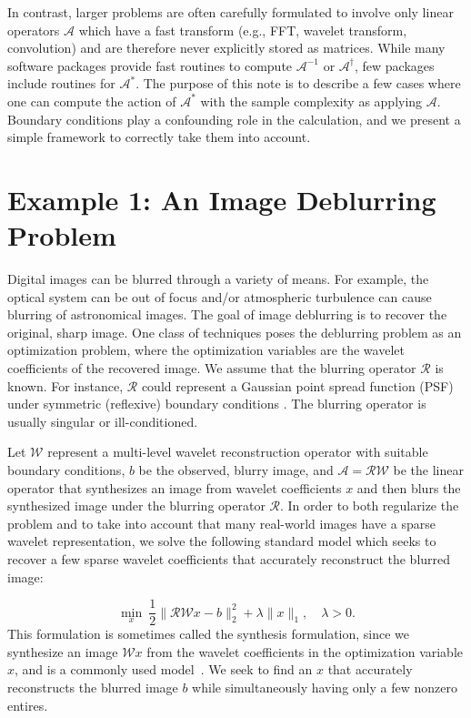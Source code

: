 \documentclass[journal]{IEEEtran}
\newcommand{\A}{\mathcal{A}}
\begin{document}
In contrast, larger problems are often carefully formulated to involve only linear operators $\A$ which have a fast transform (e.g., FFT, wavelet transform, convolution) and are therefore never explicitly stored as matrices.  While many software packages provide fast routines to compute $\A^{-1}$ or $\A^\dagger$, few packages include routines for $\A^*$.
The purpose of this note is to describe a few cases where one can compute the action of $\A^*$ with the sample complexity as applying $\A$. Boundary conditions play a confounding role in the calculation, and we present a simple framework to correctly take them into account.

\section{Example 1: An Image Deblurring Problem}
Digital images can be blurred through a variety of means.  For example, the optical system can be out of focus and/or atmospheric turbulence can cause blurring of astronomical images.  The goal of image deblurring is to recover the original, sharp image. One class of techniques poses the deblurring problem  as an optimization problem, where the optimization variables are the wavelet coefficients of the recovered image.  We assume  that the blurring operator $\mathcal{R}$ is known. For instance, $\mathcal{R}$ could represent a Gaussian point spread function (PSF) under symmetric (reflexive) boundary conditions \cite{hansen_2006}. The blurring operator is usually singular or ill-conditioned.

Let $\mathcal{W}$ represent a multi-level wavelet reconstruction operator with suitable boundary conditions, $b$ be the observed, blurry image, and $\mathcal{A}=\mathcal{RW}$ be the linear operator that synthesizes an image from wavelet coefficients $x$ and then blurs the synthesized image under the blurring operator $\mathcal{R}$.  In order to both regularize the problem and to take into account that many real-world images have a sparse wavelet representation, we solve the following standard model which seeks to recover a few sparse wavelet coefficients that accurately reconstruct the blurred image:

\begin{equation}
\label{eq:syn_problem}
\min_x~ \dfrac{1}{2}\|\mathcal{RW}x-b\|_2^2 + \lambda \|x\|_1, \quad \lambda>0.
\end{equation}
This formulation is sometimes called the synthesis formulation, since we synthesize an image $\mathcal{W}x$ from the wavelet coefficients in the optimization variable $x$, and is a commonly used model~\cite{beck_2009}.  We seek to find an $x$ that accurately reconstructs the blurred image $b$ while simultaneously having only a few nonzero entires.
\end{document}
